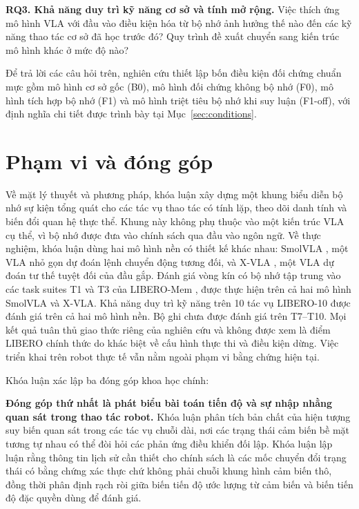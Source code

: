 \textbf{RQ3. Khả năng duy trì kỹ năng cơ sở và tính mở rộng.} Việc thích ứng mô hình VLA với đầu vào điều kiện hóa từ bộ nhớ ảnh hưởng thế nào đến các kỹ năng thao tác cơ sở đã học trước đó? Quy trình đề xuất chuyển sang kiến trúc mô hình khác ở mức độ nào?

Để trả lời các câu hỏi trên, nghiên cứu thiết lập bốn điều kiện đối chứng chuẩn mực gồm mô hình cơ sở gốc (B0), mô hình đối chứng không bộ nhớ (F0), mô hình tích hợp bộ nhớ (F1) và mô hình triệt tiêu bộ nhớ khi suy luận (F1-off), với định nghĩa chi tiết được trình bày tại Mục~\ref{sec:conditions}.

\section{Phạm vi và đóng góp}

Về mặt lý thuyết và phương pháp, khóa luận xây dựng một khung biểu diễn bộ nhớ sự kiện tổng quát cho các tác vụ thao tác có tính lặp, theo dõi danh tính và biến đổi quan hệ thực thể. Khung này không phụ thuộc vào một kiến trúc VLA cụ thể, vì bộ nhớ được đưa vào chính sách qua đầu vào ngôn ngữ. Về thực nghiệm, khóa luận dùng hai mô hình nền có thiết kế khác nhau: SmolVLA \cite{smolvla2025}, một VLA nhỏ gọn dự đoán lệnh chuyển động tương đối, và X-VLA \cite{xvla2025}, một VLA dự đoán tư thế tuyệt đối của đầu gắp. Đánh giá vòng kín có bộ nhớ tập trung vào các task suites T1 và T3 của LIBERO-Mem \cite{liberomemSource}, được thực hiện trên cả hai mô hình SmolVLA và X-VLA. Khả năng duy trì kỹ năng trên 10 tác vụ LIBERO-10 \cite{liberoSource} được đánh giá trên cả hai mô hình nền. Bộ ghi chưa được đánh giá trên T7--T10. Mọi kết quả tuân thủ giao thức riêng của nghiên cứu và không được xem là điểm LIBERO chính thức do khác biệt về cấu hình thực thi và điều kiện dừng. Việc triển khai trên robot thực tế vẫn nằm ngoài phạm vi bằng chứng hiện tại.

Khóa luận xác lập ba đóng góp khoa học chính:

\textbf{Đóng góp thứ nhất là phát biểu bài toán tiến độ và sự nhập nhằng quan sát trong thao tác robot.} Khóa luận phân tích bản chất của hiện tượng suy biến quan sát trong các tác vụ chuỗi dài, nơi các trạng thái cảm biến bề mặt tương tự nhau có thể đòi hỏi các phản ứng điều khiển đối lập. Khóa luận lập luận rằng thông tin lịch sử cần thiết cho chính sách là các mốc chuyển đổi trạng thái có bằng chứng xác thực chứ không phải chuỗi khung hình cảm biến thô, đồng thời phân định rạch ròi giữa biến tiến độ ước lượng từ cảm biến và biến tiến độ đặc quyền dùng để đánh giá.

